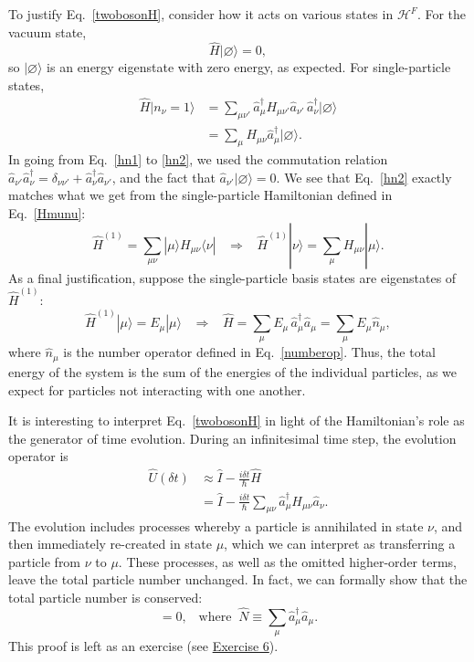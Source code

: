 \documentclass[prx,12pt]{revtex4-2}
\begin{document}
To justify Eq.~\eqref{twobosonH}, consider how it acts on various
states in $\mathscr{H}^F$.  For the vacuum state,
\begin{equation}
  \hat{H}|\varnothing\rangle = 0,
\end{equation}
so $|\varnothing\rangle$ is an energy eigenstate with zero energy, as
expected.  For single-particle states,
\begin{align}
  \hat{H} |n_\nu = 1\rangle
  &= \sum_{\mu\nu'} \hat{a}^\dagger_{\mu} H_{\mu\nu'} \hat{a}_{\nu'}\,
  \hat{a}_\nu^\dagger | \varnothing\rangle \label{hn1} \\
  &= \sum_{\mu} H_{\mu\nu} \hat{a}^\dagger_{\mu} |\varnothing\rangle.
      \label{hn2}
\end{align}
In going from Eq.~\eqref{hn1} to \eqref{hn2}, we used the commutation
relation $\hat{a}_{\nu'} \hat{a}_\nu^\dagger = \delta_{\nu\nu'} +
\hat{a}_\nu^\dagger \hat{a}_{\nu'}$, and the fact that
$\hat{a}_{\nu'}|\varnothing\rangle = 0$.  We see that Eq.~\eqref{hn2}
exactly matches what we get from the single-particle Hamiltonian
defined in Eq.~\eqref{Hmunu}:
\begin{equation}
  \hat{H}^{(1)} = \sum_{\mu\nu} |\mu\rangle H_{\mu\nu} \langle \nu|
  \;\;\;\Rightarrow\;\;\;
  \hat{H}^{(1)} |\nu\rangle = \sum_\mu H_{\mu\nu} |\mu\rangle.
\end{equation}
As a final justification, suppose the single-particle basis states are
eigenstates of $\hat{H}^{(1)}$:
\begin{equation}
  \hat{H}^{(1)}|\mu\rangle = E_\mu |\mu\rangle
  \;\;\;\Rightarrow\;\;\;
  \hat{H} = \sum_{\mu} E_\mu \, \hat{a}^\dagger_\mu \hat{a}_\mu
  = \sum_{\mu} E_\mu \hat{n}_\mu,
\end{equation}
where $\hat{n}_\mu$ is the number operator defined in
Eq.~\eqref{numberop}.  Thus, the total energy of the system is the sum
of the energies of the individual particles, as we expect for
particles not interacting with one another.

It is interesting to interpret Eq.~\eqref{twobosonH} in light of the
Hamiltonian's role as the generator of time evolution.  During an
infinitesimal time step, the evolution operator is
\begin{align}
  \hat{U}(\delta t) &\approx
  \hat{I} - \frac{i \delta t}{\hbar} \hat{H} \\
  &= \hat{I} - \frac{i \delta t}{\hbar} \sum_{\mu\nu} \hat{a}^\dagger_\mu H_{\mu\nu} \hat{a}_\nu.
\end{align}
The evolution includes processes whereby a particle is annihilated in
state $\nu$, and then immediately re-created in state $\mu$, which we
can interpret as transferring a particle from $\nu$ to $\mu$.  These
processes, as well as the omitted higher-order terms, leave the total
particle number unchanged.  In fact, we can formally show that the
total particle number is conserved:
\begin{equation}
  [\hat{H}, \hat{N}] = 0, \;\;\;\mathrm{where}\;\;\hat{N} \equiv \sum_\mu \hat{a}_\mu^\dagger \hat{a}_\mu.
  \label{Hdiag}
\end{equation}
This proof is left as an exercise (see
\hyperref[ex:n_conserved]{Exercise 6}).
\end{document}
